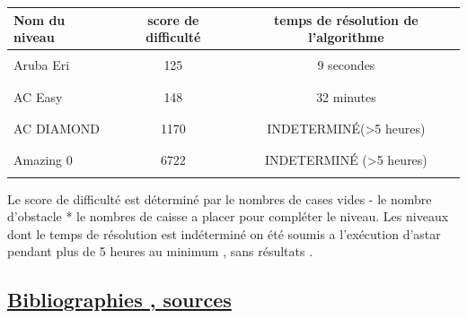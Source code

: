\documentclass{article}
\begin{document}
\begin{tabular}{|l || c | c |}
\hline
  Nom du niveau & score de difficulté & temps de résolution de l'algorithme \\
 \hline
 \hline
 & &\\
 Aruba Eri & 125 & 9 secondes  \\
  & &\\
  \hline
  & &\\
 AC Easy& 148 & 32 minutes \\
  & &\\
  \hline
  & &\\
 AC DIAMOND& 1170 & INDETERMINÉ(>5 heures) \\
  & &\\
  \hline
  & &\\
 Amazing 0& 6722 & INDETERMINÉ (>5 heures)\\
  & &\\
 \hline
 \end{tabular}
\vspace{1cm}



Le score de difficulté est déterminé par le nombres de cases vides - le nombre d'obstacle * le nombres de caisse a placer pour compléter le niveau. Les niveaux dont le temps de résolution est indéterminé on été soumis a l'exécution d'astar pendant plus de 5 heures au minimum , sans résultats .

 
 



\newpage
\begin{center}
	\section{\underline{Bibliographies , sources}}
\end{center}
\end{document}
